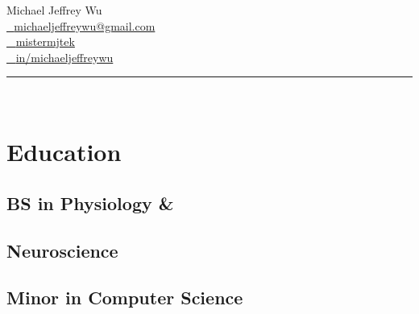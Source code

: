 \documentclass[]{deedy-resume-openfont}
\begin{document}
%
%

\lastupdated

%
%



%
%

\begin{minipage}[t]{0.33\textwidth} 

\vspace{1mm}

\fontsize{20pt}{15cm}\selectfont Michael Jeffrey Wu \vspace{3mm}\\
\color{headings}\fontsize{11pt}{14pt}\selectfont 
\href{mailto:michaeljeffreywu@gmail.com}{{\FA \faEnvelope} \,\, {michaeljeffreywu@gmail.com}} \\
\href{https://github.com/mistermjtek}{{\FA \faGithubSign} \,\,\, {mistermjtek}} \\
\href{https://www.linkedin.com/in/michaeljeffreywu}{{\FA \faLinkedinSign} \,\,\, {in/michaeljeffreywu}} \\
\rule{6cm}{0.4pt} \\



\section{Education} 
\subsection{BS in Physiology \&}
\subsection{Neuroscience}
\sectionsep

\subsection{Minor in Computer Science}	
\sectionsep



\end{minipage}
\end{document}
